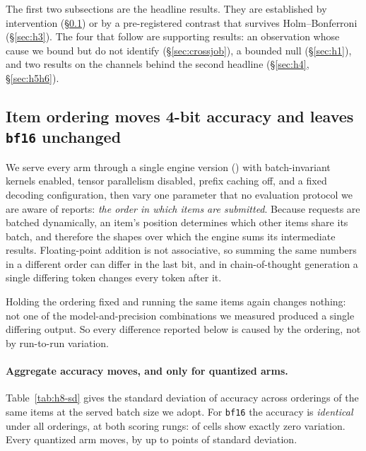 \documentclass[11pt]{article}
\begin{document}
The first two subsections are the headline results. They are established by intervention
(\S\ref{sec:h8}) or by a pre-registered contrast that survives Holm--Bonferroni
(\S\ref{sec:h3}). The four that follow
are supporting results: an observation whose cause we bound but do not identify
(\S\ref{sec:crossjob}), a bounded null (\S\ref{sec:h1}), and two results on the channels
behind the second headline (\S\ref{sec:h4}, \S\ref{sec:h5h6}).

\subsection{Item ordering moves 4-bit accuracy and leaves \texttt{bf16} unchanged}
\label{sec:h8}


We serve every arm through a single engine version (\hEightEngine) with
batch-invariant kernels enabled, tensor parallelism disabled, prefix caching
off, and a fixed decoding configuration, then vary one parameter that no
evaluation protocol we are aware of reports: \emph{the order in which items are
submitted}. Because requests are batched dynamically, an item's position determines which other
items share its batch, and therefore the shapes over which the engine sums its
intermediate results. Floating-point addition is not associative, so summing the same
numbers in a different order can differ in the last bit, and in chain-of-thought
generation a single differing token changes every token after it.

Holding the ordering fixed and running the same items again changes nothing: not one
of the \hEightNCells{} model-and-precision combinations we measured produced a single
differing output. So every difference reported below is caused by the ordering, not by
run-to-run variation.

\paragraph{Aggregate accuracy moves, and only for quantized arms.}
Table~\ref{tab:h8-sd} gives the standard deviation of accuracy across
\hEightSDOrderings{} orderings of the same \hEightItems{} items at the served
batch size we adopt. For \texttt{bf16} the accuracy is \emph{identical} under all
\hEightSDOrderings{} orderings, at both scoring rungs: \hEightBFTenZero{} of
\hEightBFTenCells{} cells show exactly zero variation. Every quantized arm moves,
by up to \hEightWorstSDTen{} points of standard deviation.
\end{document}
